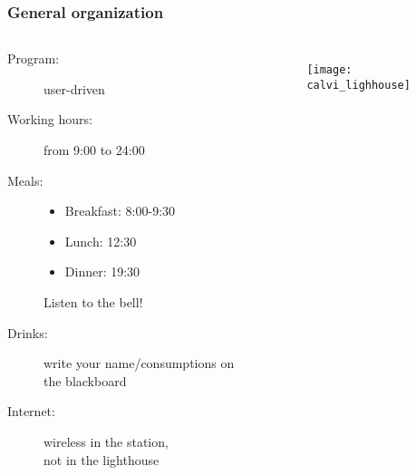 \begin{frame}[t]
\frametitle{General organization}
\footnotesize

\begin{columns}[totalwidth=\textwidth,c]


\begin{description}

\item[Program:] user-driven 
\item[Working hours:] from 9:00 to 24:00
\item[]
\item[Meals:]\begin{itemize}
\item Breakfast: 8:00-9:30
\item Lunch: 12:30
\item Dinner: 19:30
\end{itemize}
Listen to the bell!
\item[Drinks:] write your name/consumptions on the blackboard
\item[]
\item[Internet:] wireless in the station,\\
not in the lighthouse
\end{description}

{
\begin{figure}
\centering
\texttt{[image: calvi\_lighhouse]}
\end{figure}
}
\end{columns}
\end{frame}


